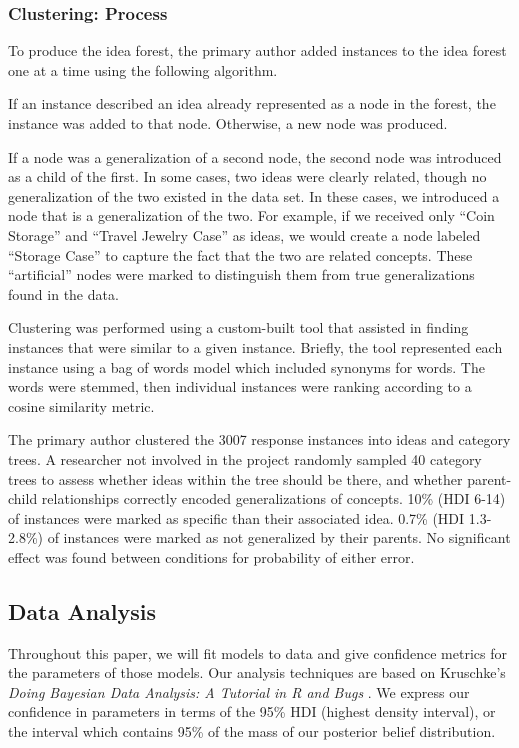 \subsubsection{Clustering: Process}
To produce the idea forest, the primary author added instances to the idea forest one at a time using the following algorithm.

If an instance described an idea already represented as a node in the forest, the instance was added to that node. Otherwise, a new node was produced.

If a node was a generalization of a second node, the second node was introduced as a child of the first. In some cases, two ideas were clearly related, though no generalization of the two existed in the data set. In these cases, we introduced a node that is a generalization of the two. For example, if we received only ``Coin Storage'' and ``Travel Jewelry Case'' as ideas, we would create a node labeled ``Storage Case'' to capture the fact that the two are related concepts. These ``artificial'' nodes were marked to distinguish them from true generalizations found in the data.

Clustering was performed using a custom-built tool that assisted in finding instances that were similar to a given instance. Briefly, the tool represented each instance using a bag of words model which included synonyms for words. The words were stemmed, then individual instances were ranking according to a cosine similarity metric.

The primary author clustered the 3007 response instances into ideas and category trees. A researcher not involved in the project randomly sampled 40 category trees to assess whether ideas within the tree should be there, and whether parent-child relationships correctly encoded generalizations of concepts. 10\% (HDI 6-14) of instances were marked as specific than their associated idea. 0.7\% (HDI 1.3-2.8\%) of instances were marked as not generalized by their parents. No significant effect was found between conditions for probability of either error.

\subsection{Data Analysis}
Throughout this paper, we will fit models to data and give confidence metrics for the parameters of those models. Our analysis techniques are based on Kruschke's \emph{Doing Bayesian Data Analysis: A Tutorial in R and Bugs} \cite{kruschke_doing_2010}. We express our confidence in parameters in terms of the 95\% HDI (highest density interval), or the interval which contains 95\% of the mass of our posterior belief distribution.


